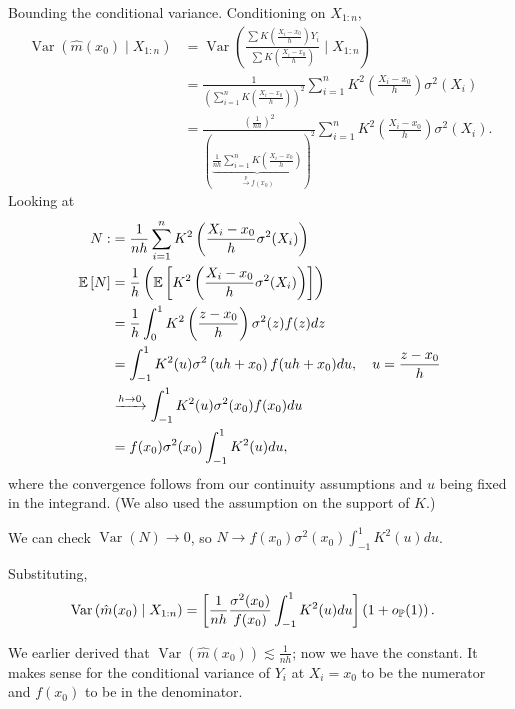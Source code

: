 Bounding the conditional variance.
Conditioning on $X_{1:n}$, 
\begin{align*}
	\operatorname{Var}\left(\hat{m}(x_0) \mid X_{1:n}\right) &= \operatorname{Var}\left(\frac{\sum K\left( \frac{X_i-x_0}{h}\right)Y_i}{\sum K\left( \frac{X_i - x_0}{h} \right)} \mid X_{1:n}\right) \\
	 &= \frac{1}{\left( \sum\limits_{i=1}^{n} K\left( \frac{X_i-x_0}{h} \right)\right)^2} \sum\limits_{i=1}^{n} K^2\left( \frac{X_i-x_0}{h} \right)\sigma^2(X_i) \\
	 &= \frac{\left( \frac{1}{nh} \right)^2}{\left(\underbrace{ \frac{1}{nh} \sum\limits_{i=1}^{n} K\left( \frac{X_i-x_0}{h} \right)}_{\xrightarrow{p} f(x_0)}\right)^2} \sum\limits_{i=1}^{n} K^2\left( \frac{X_i-x_0}{h} \right)\sigma^2(X_i)
.\end{align*} 
Looking at
\begin{align*}
	N:&= \frac{1}{nh} \sum\limits_{i=1}^{n} K^2\left( \frac{X_i-x_0}{h}\sigma^2(X_i) \right) \\
	\E\left[N\right] &= \frac{1}{h} \left( \E\left[K^2\left( \frac{X_i-x_0}{h}\sigma^2 (X_i)\right)\right]  \right) \\
					 &= \frac{1}{h} \int_0^1 K^2\left( \frac{z-x_0}{h} \right) \sigma^2(z) f(z)dz \\
					 &= \int_{-1}^{1} K^2(u) \sigma^2\left( uh + x_0 \right) f(uh + x_0)du , \quad u = \frac{z-x_0}{h} \\
					 &\xrightarrow{h\to 0} \int_{-1}^{1} K^2(u) \sigma^2(x_0) f(x_0)du \\
					 &= f(x_0) \sigma^2(x_0) \int_{-1}^{1} K^2(u)du 
,\end{align*}
where the convergence follows from our continuity assumptions and $u$ being fixed in the integrand. (We also used the assumption on the support of $K$.)

We can check $\operatorname{Var}\left(N\right) \to 0$, so $N \to f(x_0)\sigma^2(x_0) \int_{-1}^{1} K^2(u)du $.

Substituting, 
\begin{align*}
\operatorname{Var}\left(\hat{m}(x_0) \mid X_{1:n}\right) &= \left[ \frac{1}{nh} \frac{\sigma^2(x_0)}{f(x_0)} \int_{-1}^{1} K^2(u)du \right] \left( 1 + o_{\P}(1) \right) 
.\end{align*}

We earlier derived that $\operatorname{Var}\left(\hat{m}(x_0)\right) \lesssim \frac{1}{nh}$; now we have the constant. It makes sense for the conditional variance of $Y_i$ at $X_i = x_0$ to be the numerator and $f(x_0)$ to be in the denominator.

